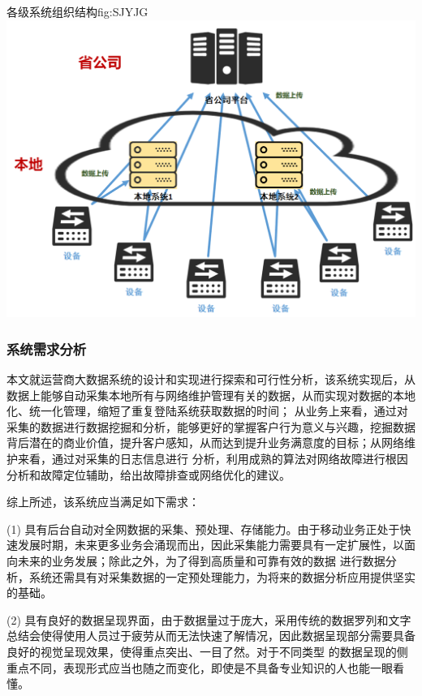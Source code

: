 \documentclass{HustGraduPaper}
\begin{document}
    \begin{generalfig}{各级系统组织结构}{fig:SJYJG} 
        \includegraphics[width = \textwidth]{Figures/SJYJG.png} 
    \end{generalfig}

    \subsubsection{系统需求分析}
    本文就运营商大数据系统的设计和实现进行探索和可行性分析，该系统实现后，从数据上能够自动采集本地所有与网络维护管理有关的数据，从而实现对数据的本地化、统一化管理，缩短了重复登陆系统获取数据的时间；
    从业务上来看，通过对采集的数据进行数据挖掘和分析，能够更好的掌握客户行为意义与兴趣，挖掘数据背后潜在的商业价值，提升客户感知，从而达到提升业务满意度的目标；从网络维护来看，通过对采集的日志信息进行
    分析，利用成熟的算法对网络故障进行根因分析和故障定位辅助，给出故障排查或网络优化的建议。

    综上所述，该系统应当满足如下需求：

    (1) 具有后台自动对全网数据的采集、预处理、存储能力。由于移动业务正处于快速发展时期，未来更多业务会涌现而出，因此采集能力需要具有一定扩展性，以面向未来的业务发展；除此之外，为了得到高质量和可靠有效的数据
    进行数据分析，系统还需具有对采集数据的一定预处理能力，为将来的数据分析应用提供坚实的基础。
    
    (2) 具有良好的数据呈现界面，由于数据量过于庞大，采用传统的数据罗列和文字总结会使得使用人员过于疲劳从而无法快速了解情况，因此数据呈现部分需要具备良好的视觉呈现效果，使得重点突出、一目了然。对于不同类型
    的数据呈现的侧重点不同，表现形式应当也随之而变化，即使是不具备专业知识的人也能一眼看懂。
\end{document}
